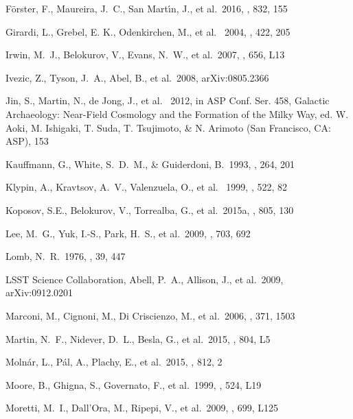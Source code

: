 \documentclass[iop]{emulateapj}
\begin{document}
\begin{thebibliography}{}
 F{\"o}rster, F., Maureira, J.~C., San Mart{\'{\i}}n, J., et al.\ 2016, \apj, 832, 155 

 Girardi, L., Grebel, E. K., Odenkirchen, M., et al. \ 2004, \aap, 422, 205

 Irwin, M.~J., Belokurov, V., Evans, N.~W., et al.\ 2007, \apjl, 656, L13 

 Ivezic, Z., Tyson, J.~A., Abel, B., et al.\ 2008, arXiv:0805.2366

 Jin, S., Martin, N., de Jong, J., et al. \ 2012, in ASP Conf. Ser. 458, Galactic Archaeology: Near-Field Cosmology and the Formation of the Milky Way, ed. W. Aoki, M. Ishigaki, T. Suda, T. Tsujimoto, \& N. Arimoto (San Francisco, CA: ASP), 153

 Kauffmann, G., White, S.~D.~M., \& Guiderdoni, B.\ 1993, \mnras, 264, 201 

 Klypin, A., Kravtsov, A.~V., Valenzuela, O., et al. \ 1999, \apj, 522, 82 

 Koposov, S.E., Belokurov, V., Torrealba, G., et al.\ 2015a, \apj, 805, 130 

 Lee, M.~G., Yuk, I.-S., Park, H.~S., et al.\ 2009, \apj, 703, 692 

 Lomb, N.~R.\ 1976, \apss, 39, 447 

 LSST Science Collaboration, Abell, P.~A., Allison, J., et al.\ 2009, arXiv:0912.0201 

 Marconi, M., Cignoni, M., Di Criscienzo, M., et al.\ 2006, \mnras, 371, 1503 

 Martin, N.~F., Nidever, D.~L., Besla, G., et al.\ 2015, \apjl, 804, L5

 Moln{\'a}r, L., P{\'a}l, A., Plachy, E., et al.\ 2015, \apj, 812, 2 

 Moore, B., Ghigna, S., Governato, F., et al.\ 1999, \apjl, 524, L19 

 Moretti, M.~I., Dall'Ora, M., Ripepi, V., et al.\ 2009, \apjl, 699, L125 


\end{thebibliography}
\end{document}
